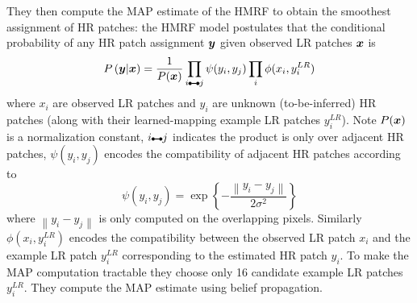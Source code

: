 %
They then compute the MAP estimate of the HMRF to obtain the smoothest assignment of HR patches: the HMRF model postulates that the conditional probability of any HR patch assignment $\bm{y}$ given observed LR patches $\bm{x}$ is
\begin{equation}
    P\left( \by \middle| \bx \right) = \frac{1}{P(\bx)} \prod_{i\ue{} j} \psi(y_i, y_j) \prod_i \phi(x_i, y_i^{LR})
\end{equation}
where $x_i$ are observed LR patches and $y_i$ are unknown (to-be-inferred) HR patches (along with their learned-mapping example LR patches $y_i^{LR}$).
%
Note $P(\bm{x})$ is a normalization constant, $i\ue{} j$ indicates the product is only over adjacent HR patches, $\psi(y_i, y_j)$ encodes the compatibility of adjacent HR patches according to
\begin{equation}
    \psi(y_i, y_j) = \exp \left\{ -  \frac{\left\| y_i - y_j \right\|}{2\sigma^2} \right\}
\end{equation}
where $\left\| y_i - y_j \right\|$ is only computed on the overlapping pixels.
%
Similarly $\phi(x_i, y_i^{LR})$ encodes the compatibility between the observed LR patch $x_i$ and the example LR patch $y_i^{LR}$ corresponding to the estimated HR patch $y_i$.
%
To make the MAP computation tractable they choose only 16 candidate example LR patches $y_i^{LR}$.
%
They compute the MAP estimate using belief propagation.
